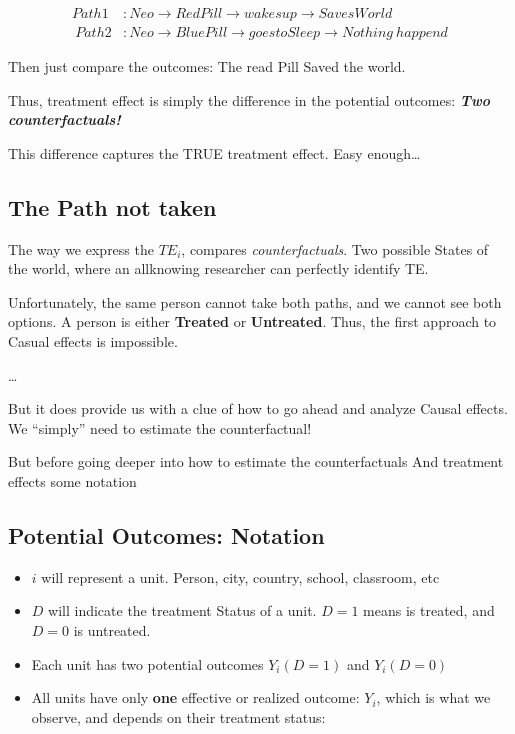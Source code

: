 \documentclass[
  letterpaper,
  DIV=11,
  numbers=noendperiod]{scrartcl}
\begin{document}
\[
\begin{aligned}
Path1 &: Neo \rightarrow RedPill \rightarrow wakesup \rightarrow SavesWorld \\\
Path2 &: Neo \rightarrow BluePill \rightarrow goestoSleep \rightarrow Nothing \ happend
\end{aligned}
\]

Then just compare the outcomes: The read Pill Saved the world.

Thus, treatment effect is simply the difference in the potential
outcomes: \textbf{\emph{Two counterfactuals!}}

This difference captures the TRUE treatment effect. Easy enough\ldots{}

\hypertarget{the-path-not-taken}{%
\subsection{The Path not taken}\label{the-path-not-taken}}

The way we express the \(TE_i\), compares \emph{counterfactuals}. Two
possible States of the world, where an allknowing researcher can
perfectly identify TE.

Unfortunately, the same person cannot take both paths, and we cannot see
both options. A person is either \textbf{Treated} or \textbf{Untreated}.
Thus, the first approach to Casual effects is impossible.

\ldots{}

But it does provide us with a clue of how to go ahead and analyze Causal
effects. We ``simply'' need to estimate the counterfactual!

But before going deeper into how to estimate the counterfactuals And
treatment effects some notation

\hypertarget{potential-outcomes-notation}{%
\subsection{Potential Outcomes:
Notation}\label{potential-outcomes-notation}}

\begin{itemize}
\item
  \(i\) will represent a unit. Person, city, country, school, classroom,
  etc
\item
  \(D\) will indicate the treatment Status of a unit. \(D=1\) means is
  treated, and \(D=0\) is untreated.
\item
  Each unit has two potential outcomes \(Y_i(D=1)\) and \(Y_i(D=0)\)
\item
  All units have only \textbf{one} effective or realized outcome:
  \(Y_i\), which is what we observe, and depends on their treatment
  status:
\end{itemize}
\end{document}
